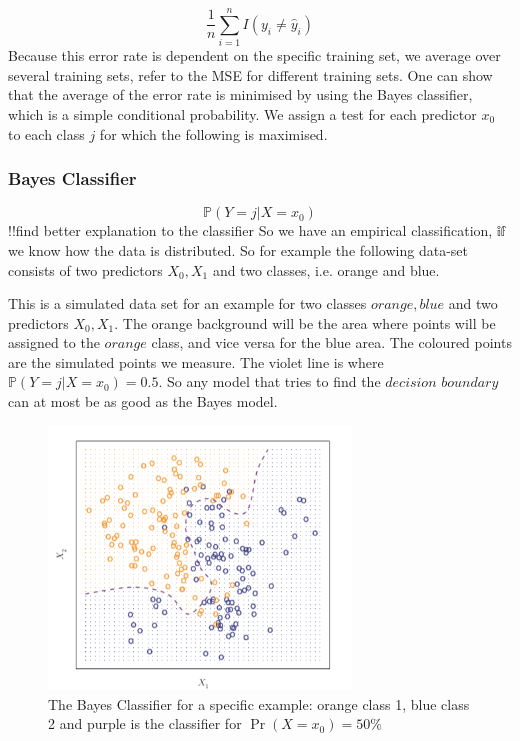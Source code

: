 \documentclass{article}
\begin{document}
\begin{equation}
\frac{1}{n} \sum _{i=1}^{n}I(y_i\neq \hat y _i )
\end{equation}
Because this error rate is dependent on the specific training set, we average over several training sets, refer to the MSE for different training sets. One can show that the average of the error rate is minimised by using the Bayes classifier, which is a simple conditional probability. We assign a test for each predictor $x_0$ to each class $j$ for which the following is maximised. 

\subsubsection{Bayes Classifier}

\begin{equation}
\mathbb P (Y=j | X = x_0)
\end{equation}
!!find better explanation to the classifier
So we have an empirical classification, $\mathbb{if}$ we know how the data is distributed. So for example the following data-set consists of two predictors $X_0,X_1$ and two classes, i.e. orange and blue.




This is a simulated data set for an example for two classes $orange,blue$ and two predictors $X_0,X_1$. The orange background will be the area where points will be assigned to the $orange$ class, and vice versa for the blue area. The coloured points are the simulated points we measure. The violet line is where $\mathbb P (Y=j | X = x_0) = 0.5$. So any model that tries to find the $\textit{decision boundary}$ can at most be as good as the Bayes model.

\begin{figure}[ht]
    \centering
    \includegraphics[height=70mm]{bayes_classifier_chapter2.png}
    \caption{The Bayes Classifier for a specific example: orange class 1, blue class 2 and purple is the classifier for $\Pr (X=x_0)=50\% $}
    \label{fig:bayes_classifier_example}
\end{figure}
\end{document}
